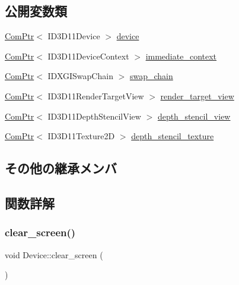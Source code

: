 \subsection*{公開変数類}
\begin{DoxyCompactItemize}
\item 
\mbox{\hyperlink{common_8h_ab7d7d9064a34dd725663b1dbee652aca}{Com\+Ptr}}$<$ I\+D3\+D11\+Device $>$ \mbox{\hyperlink{class_device_af0aeb4e2375287fe02fc5154015b53be}{device}}
\item 
\mbox{\hyperlink{common_8h_ab7d7d9064a34dd725663b1dbee652aca}{Com\+Ptr}}$<$ I\+D3\+D11\+Device\+Context $>$ \mbox{\hyperlink{class_device_a445dfbc67c6d8ad039ee462a891d63fc}{immediate\+\_\+context}}
\item 
\mbox{\hyperlink{common_8h_ab7d7d9064a34dd725663b1dbee652aca}{Com\+Ptr}}$<$ I\+D\+X\+G\+I\+Swap\+Chain $>$ \mbox{\hyperlink{class_device_a8e522e4b61ad77b6581d4a160234c790}{swap\+\_\+chain}}
\item 
\mbox{\hyperlink{common_8h_ab7d7d9064a34dd725663b1dbee652aca}{Com\+Ptr}}$<$ I\+D3\+D11\+Render\+Target\+View $>$ \mbox{\hyperlink{class_device_ad50562d65b7c377ff48bf3ca26555028}{render\+\_\+target\+\_\+view}}
\item 
\mbox{\hyperlink{common_8h_ab7d7d9064a34dd725663b1dbee652aca}{Com\+Ptr}}$<$ I\+D3\+D11\+Depth\+Stencil\+View $>$ \mbox{\hyperlink{class_device_ac76a2dc2c3c49bb40f82c6d5300bf2b8}{depth\+\_\+stencil\+\_\+view}}
\item 
\mbox{\hyperlink{common_8h_ab7d7d9064a34dd725663b1dbee652aca}{Com\+Ptr}}$<$ I\+D3\+D11\+Texture2D $>$ \mbox{\hyperlink{class_device_a077098001481f1c1c0c274caba595625}{depth\+\_\+stencil\+\_\+texture}}
\end{DoxyCompactItemize}
\subsection*{その他の継承メンバ}


\subsection{関数詳解}
\mbox{\label{class_device_a17cd76103195bae419de11d43a4eeecd}} 
\subsubsection{\texorpdfstring{clear\+\_\+screen()}{clear\_screen()}}
{\footnotesize\ttfamily void Device\+::clear\+\_\+screen (\begin{DoxyParamCaption}{ }\end{DoxyParamCaption})}

